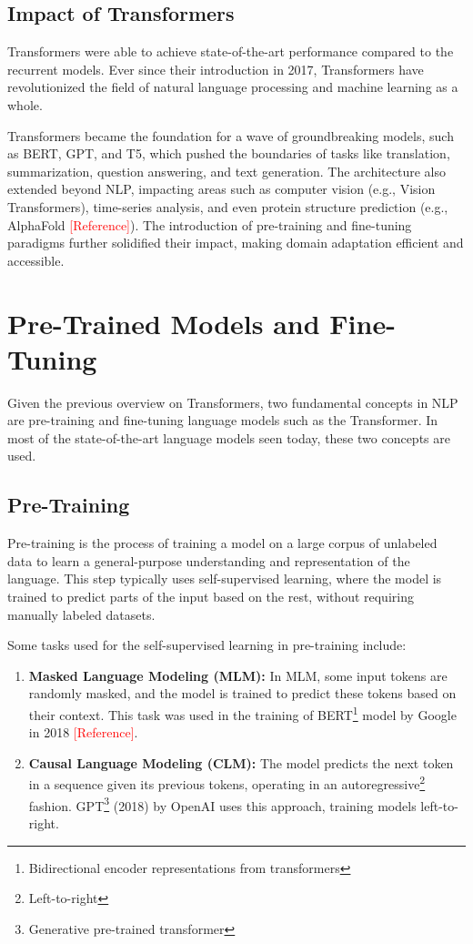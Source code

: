 \subsection{Impact of Transformers}
Transformers were able to achieve state-of-the-art performance compared to the recurrent models. 
Ever since their introduction in 2017, Transformers have revolutionized the field of natural language processing and machine learning as a whole. 

Transformers became the foundation for a wave of groundbreaking models, such as BERT, GPT, and T5, which pushed the boundaries of tasks like translation, summarization, question answering, and text generation. The architecture also extended beyond NLP, impacting areas such as computer vision (e.g., Vision Transformers), time-series analysis, and even protein structure prediction (e.g., AlphaFold \textcolor{red}{[Reference]}). The introduction of pre-training and fine-tuning paradigms further solidified their impact, making domain adaptation efficient and accessible.

\section{Pre-Trained Models and Fine-Tuning}
Given the previous overview on Transformers, two fundamental concepts in NLP are pre-training and fine-tuning language models such as the Transformer. In most of the state-of-the-art language models seen today, these two concepts are used.

\subsection{Pre-Training}
Pre-training is the process of training a model on a large corpus of unlabeled data to learn a general-purpose understanding and representation of the language. This step typically uses self-supervised learning, where the model is trained to predict parts of the input based on the rest, without requiring manually labeled datasets.

Some tasks used for the self-supervised learning in pre-training include:

\begin{enumerate}
    \item \textbf{Masked Language Modeling (MLM):} In MLM, some input tokens are randomly masked, and the model is trained to predict these tokens based on their context. This task was used in the training of BERT\footnote{Bidirectional encoder representations from transformers}  model by Google in 2018 \textcolor{red}{[Reference]}.

    \item \textbf{Causal Language Modeling (CLM):} The model predicts the next token in a sequence given its previous tokens, operating in an autoregressive\footnote{Left-to-right} fashion. GPT\footnote{Generative pre-trained transformer} (2018) by OpenAI uses this approach, training models left-to-right.
\end{enumerate}

